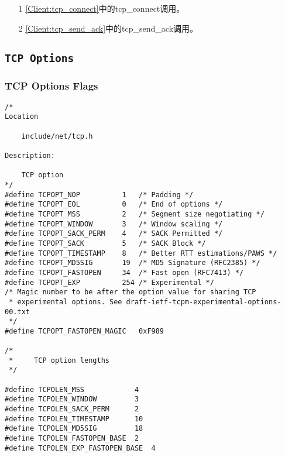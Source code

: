             \begin{enumerate}
                \item[1]        \ref{Client:tcp_connect}中的tcp\_connect调用。
                \item[2]        \ref{Client:tcp_send_ack}中的tcp\_send\_ack调用。
            \end{enumerate}

    \subsection{\texttt{TCP Options}}
        \subsubsection{TCP Options Flags}

\begin{verbatim}
/*
Location

    include/net/tcp.h
    
Description:
    
    TCP option
*/
#define TCPOPT_NOP          1   /* Padding */
#define TCPOPT_EOL          0   /* End of options */
#define TCPOPT_MSS          2   /* Segment size negotiating */
#define TCPOPT_WINDOW       3   /* Window scaling */
#define TCPOPT_SACK_PERM    4   /* SACK Permitted */
#define TCPOPT_SACK         5   /* SACK Block */
#define TCPOPT_TIMESTAMP    8   /* Better RTT estimations/PAWS */
#define TCPOPT_MD5SIG       19  /* MD5 Signature (RFC2385) */
#define TCPOPT_FASTOPEN     34  /* Fast open (RFC7413) */
#define TCPOPT_EXP          254 /* Experimental */
/* Magic number to be after the option value for sharing TCP
 * experimental options. See draft-ietf-tcpm-experimental-options-00.txt
 */
#define TCPOPT_FASTOPEN_MAGIC   0xF989

/*
 *     TCP option lengths
 */

#define TCPOLEN_MSS            4
#define TCPOLEN_WINDOW         3
#define TCPOLEN_SACK_PERM      2
#define TCPOLEN_TIMESTAMP      10
#define TCPOLEN_MD5SIG         18
#define TCPOLEN_FASTOPEN_BASE  2
#define TCPOLEN_EXP_FASTOPEN_BASE  4
\end{verbatim}        
